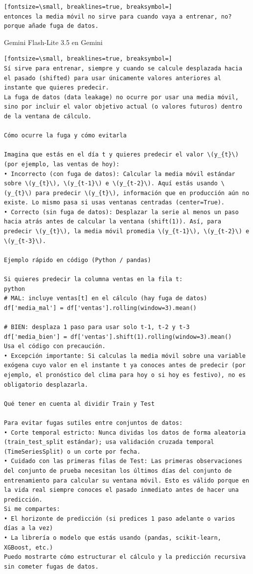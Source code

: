 \documentclass[12pt,a4paper,oneside]{book}
\begin{document}
\begin{iaprompt}
\begin{Verbatim}[fontsize=\small, breaklines=true, breaksymbol=]
entonces la media móvil no sirve para cuando vaya a entrenar, no? porque añade fuga de datos.
\end{Verbatim}
\end{iaprompt}
\begin{iaresp}{Gemini Flash-Lite 3.5 en Gemini}
\begin{Verbatim}[fontsize=\small, breaklines=true, breaksymbol=]
Sí sirve para entrenar, siempre y cuando se calcule desplazada hacia el pasado (shifted) para usar únicamente valores anteriores al instante que quieres predecir.
La fuga de datos (data leakage) no ocurre por usar una media móvil, sino por incluir el valor objetivo actual (o valores futuros) dentro de la ventana de cálculo.

Cómo ocurre la fuga y cómo evitarla

Imagina que estás en el día t y quieres predecir el valor \(y_{t}\) (por ejemplo, las ventas de hoy):
• Incorrecto (con fuga de datos): Calcular la media móvil estándar sobre \(y_{t}\), \(y_{t-1}\) e \(y_{t-2}\). Aquí estás usando \(y_{t}\) para predecir \(y_{t}\), información que en producción aún no existe. Lo mismo pasa si usas ventanas centradas (center=True).
• Correcto (sin fuga de datos): Desplazar la serie al menos un paso hacia atrás antes de calcular la ventana (shift(1)). Así, para predecir \(y_{t}\), la media móvil promedia \(y_{t-1}\), \(y_{t-2}\) e \(y_{t-3}\).

Ejemplo rápido en código (Python / pandas)

Si quieres predecir la columna ventas en la fila t:
python
# MAL: incluye ventas[t] en el cálculo (hay fuga de datos)
df['media_mal'] = df['ventas'].rolling(window=3).mean()

# BIEN: desplaza 1 paso para usar solo t-1, t-2 y t-3
df['media_bien'] = df['ventas'].shift(1).rolling(window=3).mean()
Usa el código con precaución.
• Excepción importante: Si calculas la media móvil sobre una variable exógena cuyo valor en el instante t ya conoces antes de predecir (por ejemplo, el pronóstico del clima para hoy o si hoy es festivo), no es obligatorio desplazarla.

Qué tener en cuenta al dividir Train y Test

Para evitar fugas sutiles entre conjuntos de datos:
• Corte temporal estricto: Nunca dividas los datos de forma aleatoria (train_test_split estándar); usa validación cruzada temporal (TimeSeriesSplit) o un corte por fecha.
• Cuidado con las primeras filas de Test: Las primeras observaciones del conjunto de prueba necesitan los últimos días del conjunto de entrenamiento para calcular su ventana móvil. Esto es válido porque en la vida real siempre conoces el pasado inmediato antes de hacer una predicción.
Si me compartes:
• El horizonte de predicción (si predices 1 paso adelante o varios días a la vez)
• La librería o modelo que estás usando (pandas, scikit-learn, XGBoost, etc.)
Puedo mostrarte cómo estructurar el cálculo y la predicción recursiva sin cometer fugas de datos.
\end{Verbatim}
\end{iaresp}
\end{document}
